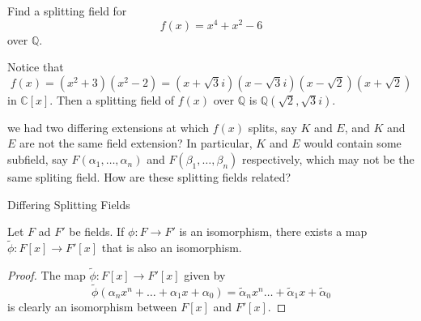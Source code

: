 \documentclass[notoc,notitlepage]{tufte-book}
\begin{document}
\begin{eg}
  Find a splitting field for
  \begin{equation*}
    f(x) = x^4 + x^2 - 6
  \end{equation*}
  over $\mathbb{Q}$.
\end{eg}

\begin{solution}
  Notice that
  \begin{equation*}
    f(x) = (x^2 + 3)(x^2 - 2) = (x + \sqrt{3} i)(x - \sqrt{3}i)(x - \sqrt{2})(x + \sqrt{2})
  \end{equation*}
  in $\mathbb{C}[x]$. Then a splitting field of $f(x)$ over $\mathbb{Q}$ is 
  $\mathbb{Q}(\sqrt{2}, \sqrt{3}i)$.
\end{solution}

 we had two differing extensions at which $f(x)$ splits, say $K$ and
$E$, and $K$ and $E$ are not the same field extension? In particular, $K$ and $E$ would contain
some subfield, say $F(\alpha_1, \ldots, \alpha_n)$ and $F(\beta_1, \ldots, \beta_n)$
respectively, which may not be the same spliting field. How are these splitting fields related?

\begin{marginfigure}
  \centering
  \caption{Differing Splitting Fields}
  \label{fig:differing_splitting_fields}
\end{marginfigure}

\begin{lemma}\label{lemma:isomorphic_fields_have_isomorphic_polynomial_rings}
  Let $F$ ad $F'$ be fields. If $\phi : F \to F'$ is an isomorphism, there exists a map
  $\tilde{\phi} : F[x] \to F'[x]$ that is also an isomorphism.
\end{lemma}

\begin{proof}
  The map $\tilde{\phi} : F[x] \to F'[x]$ given by
  \begin{equation*}
    \tilde{\phi}(\alpha_n x^n + \hdots + \alpha_1 x + \alpha_0) = \tilde{\alpha}_n x^n \hdots + \tilde{\alpha}_1 x + \tilde{\alpha}_0
  \end{equation*}
  is clearly an isomorphism between $F[x]$ and $F'[x]$.
\end{proof}
\end{document}
